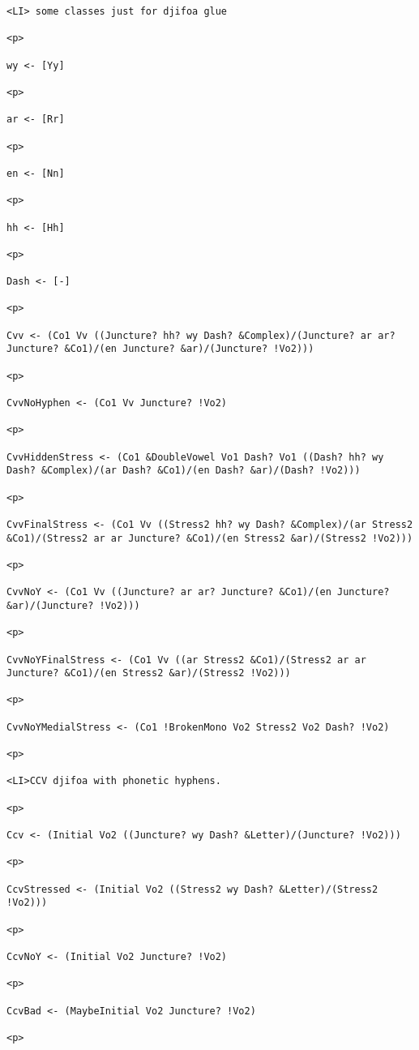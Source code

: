 \documentclass[12pt]{article}
\begin{document}
\begin{lstlisting}
<LI> some classes just for djifoa glue

<p>

wy <- [Yy]

<p>

ar <- [Rr]

<p>

en <- [Nn]

<p>

hh <- [Hh]

<p>

Dash <- [-]

<p>

Cvv <- (Co1 Vv ((Juncture? hh? wy Dash? &Complex)/(Juncture? ar ar? Juncture? &Co1)/(en Juncture? &ar)/(Juncture? !Vo2)))

<p>

CvvNoHyphen <- (Co1 Vv Juncture? !Vo2)

<p>

CvvHiddenStress <- (Co1 &DoubleVowel Vo1 Dash? Vo1 ((Dash? hh? wy Dash? &Complex)/(ar Dash? &Co1)/(en Dash? &ar)/(Dash? !Vo2)))

<p>

CvvFinalStress <- (Co1 Vv ((Stress2 hh? wy Dash? &Complex)/(ar Stress2 &Co1)/(Stress2 ar ar Juncture? &Co1)/(en Stress2 &ar)/(Stress2 !Vo2)))

<p>

CvvNoY <- (Co1 Vv ((Juncture? ar ar? Juncture? &Co1)/(en Juncture? &ar)/(Juncture? !Vo2)))

<p>

CvvNoYFinalStress <- (Co1 Vv ((ar Stress2 &Co1)/(Stress2 ar ar Juncture? &Co1)/(en Stress2 &ar)/(Stress2 !Vo2)))

<p>

CvvNoYMedialStress <- (Co1 !BrokenMono Vo2 Stress2 Vo2 Dash? !Vo2)

<p>

<LI>CCV djifoa with phonetic hyphens.

<p>

Ccv <- (Initial Vo2 ((Juncture? wy Dash? &Letter)/(Juncture? !Vo2)))

<p>

CcvStressed <- (Initial Vo2 ((Stress2 wy Dash? &Letter)/(Stress2 !Vo2)))

<p>

CcvNoY <- (Initial Vo2 Juncture? !Vo2)

<p>

CcvBad <- (MaybeInitial Vo2 Juncture? !Vo2)

<p>


\end{lstlisting}
\end{document}
